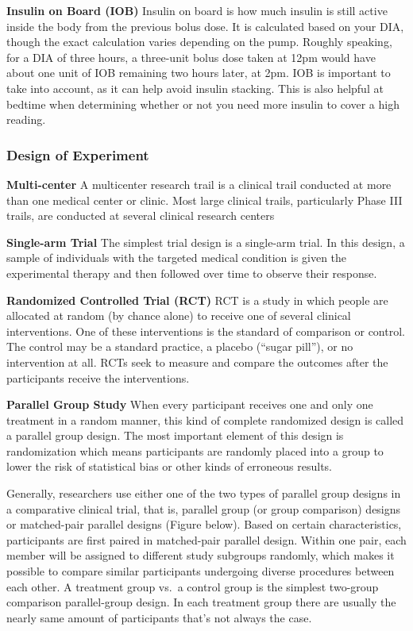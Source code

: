 \documentclass[
]{ctexart}
\begin{document}
\textbf{Insulin on Board (IOB)} Insulin on board is how much insulin is
still active inside the body from the previous bolus dose. It is
calculated based on your DIA, though the exact calculation varies
depending on the pump. Roughly speaking, for a DIA of three hours, a
three-unit bolus dose taken at 12pm would have about one unit of IOB
remaining two hours later, at 2pm. IOB is important to take into
account, as it can help avoid insulin stacking. This is also helpful at
bedtime when determining whether or not you need more insulin to cover a
high reading.

\hypertarget{design-of-experiment}{%
\subsubsection{\texorpdfstring{\textbf{Design of
Experiment}}{Design of Experiment}}\label{design-of-experiment}}

\textbf{Multi-center} A multicenter research trail is a clinical trail
conducted at more than one medical center or clinic. Most large clinical
trails, particularly Phase III trails, are conducted at several clinical
research centers

\textbf{Single-arm Trial} The simplest trial design is a single-arm
trial. In this design, a sample of individuals with the targeted medical
condition is given the experimental therapy and then followed over time
to observe their response.

\textbf{Randomized Controlled Trial (RCT)} RCT is a study in which
people are allocated at random (by chance alone) to receive one of
several clinical interventions. One of these interventions is the
standard of comparison or control. The control may be a standard
practice, a placebo (``sugar pill''), or no intervention at all. RCTs
seek to measure and compare the outcomes after the participants receive
the interventions.

\textbf{Parallel Group Study} When every participant receives one and
only one treatment in a random manner, this kind of complete randomized
design is called a parallel group design. The most important element of
this design is randomization which means participants are randomly
placed into a group to lower the risk of statistical bias or other kinds
of erroneous results.

Generally, researchers use either one of the two types of parallel group
designs in a comparative clinical trial, that is, parallel group (or
group comparison) designs or matched-pair parallel designs (Figure
below). Based on certain characteristics, participants are first paired
in matched-pair parallel design. Within one pair, each member will be
assigned to different study subgroups randomly, which makes it possible
to compare similar participants undergoing diverse procedures between
each other. A treatment group vs.~a control group is the simplest
two-group comparison parallel-group design. In each treatment group
there are usually the nearly same amount of participants that's not
always the case.
\end{document}
